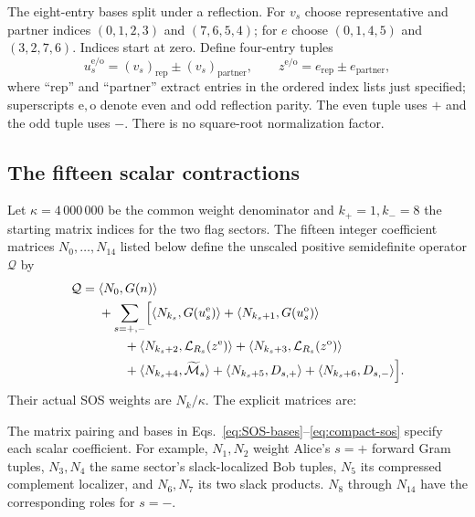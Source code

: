 \documentclass[11pt]{article}
\begin{document}
The eight-entry bases split under a reflection. For $v_s$ choose representative and partner indices $(0,1,2,3)$ and $(7,6,5,4)$; for $e$ choose $(0,1,4,5)$ and $(3,2,7,6)$. Indices start at zero. Define four-entry tuples
\begin{equation}
 u_s^{\mathrm e/\mathrm o}=(v_s)_{\mathrm{rep}}\mathbin{\pm}(v_s)_{\mathrm{partner}},\qquad
 z^{\mathrm e/\mathrm o}=e_{\mathrm{rep}}\mathbin{\pm}e_{\mathrm{partner}},
 \label{eq:SOS-parity}
\end{equation}
where ``rep'' and ``partner'' extract entries in the ordered index lists just specified; superscripts $\mathrm e,\mathrm o$ denote even and odd reflection parity. The even tuple uses $+$ and the odd tuple uses $-$. There is no square-root normalization factor.

\subsection{The fifteen scalar contractions}
Let $\kappa=4\,000\,000$ be the common weight denominator and $k_+=1,k_-=8$ the starting matrix indices for the two flag sectors. The fifteen integer coefficient matrices $N_0,\ldots,N_{14}$ listed below define the unscaled positive semidefinite operator $\mathcal Q$ by
\begin{align}
 \mathcal Q={}&\langle N_0,G(n)\rangle\notag\\
 &+\sum_{s=+,-}\Bigl[
    \langle N_{k_s},G(u_s^{\mathrm e})\rangle
   +\langle N_{k_s+1},G(u_s^{\mathrm o})\rangle\notag\\
 &\qquad+\langle N_{k_s+2},\mathcal L_{R_s}(z^{\mathrm e})\rangle
   +\langle N_{k_s+3},\mathcal L_{R_s}(z^{\mathrm o})\rangle\notag\\
 &\qquad+\langle N_{k_s+4},\widetilde{\mathcal M}_s\rangle
   +\langle N_{k_s+5},D_{s,+}\rangle
   +\langle N_{k_s+6},D_{s,-}\rangle\Bigr].
 \label{eq:compact-sos}
\end{align}
Their actual SOS weights are $N_k/\kappa$. The explicit matrices are:


The matrix pairing and bases in Eqs.~\eqref{eq:SOS-bases}--\eqref{eq:compact-sos} specify each scalar coefficient. For example, $N_1,N_2$ weight Alice's $s=+$ forward Gram tuples, $N_3,N_4$ the same sector's slack-localized Bob tuples, $N_5$ its compressed complement localizer, and $N_6,N_7$ its two slack products. $N_8$ through $N_{14}$ have the corresponding roles for $s=-$.
\end{document}
